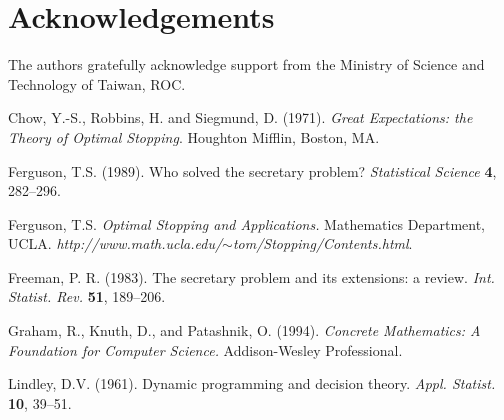 \documentclass[12pt, A4paper, oneside]{article}
\theoremstyle{plain}
\numberwithin{equation}{section}
\begin{document}
\section*{Acknowledgements}
\hspace*{18pt}The authors gratefully acknowledge support from the Ministry of Science and Technology of Taiwan, ROC.
\begin{thebibliography}{99}
\footnotesize
\itemsep=2pt


    {\sc Chow, Y.-S., Robbins, H. and Siegmund, D.} (1971).
    {\em Great Expectations: the Theory of Optimal Stopping}.
    Houghton Mifflin, Boston, MA.

    {\sc Ferguson, T.S.} (1989).
    Who solved the secretary problem?
    {\em Statistical Science} {\bf 4}, 282--296.

    {\sc Ferguson, T.S.}
    {\em Optimal Stopping and Applications.}
    Mathematics Department, UCLA.
    {\em http://www.math.ucla.edu/$\sim$tom/Stopping/Contents.html}.

    {\sc Freeman, P. R.} (1983).
    The secretary problem and its extensions: a review.
    {\em Int. Statist. Rev.} {\bf 51}, 189--206.

{\sc Graham, R., Knuth, D., and Patashnik, O.} (1994).
{\em Concrete Mathematics: A Foundation for Computer Science.}
Addison-Wesley Professional.




    {\sc Lindley, D.V.} (1961).
    Dynamic programming and decision theory.
    {\em Appl. Statist.} {\bf 10}, 39--51.


\end{thebibliography}
\end{document}
